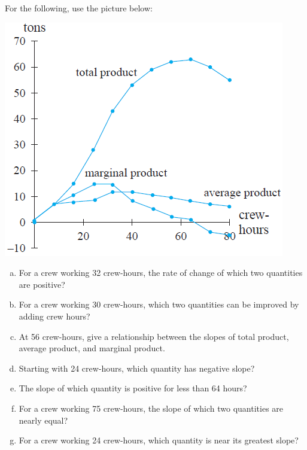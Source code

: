 \documentclass[notes]{subfiles}
\begin{document}
		\begin{ex}
			For the following, use the picture below:\\[10pt]
			\begin{center}
				\includegraphics{img/sec22-2.png}
			\end{center}
			\begin{multicols*}{2}
				\begin{enumerate}[(a)]
					\item For a crew working 32 crew-hours, the rate of change of which two quantities are positive?
						
					\item For a crew working 30 crew-hours, which two quantities can be improved by adding crew hours?
						
					\item At 56 crew-hours, give a relationship between the slopes of total product, average product, and marginal product.
						
					\item Starting with 24 crew-hours, which quantity has negative slope?
						\columnbreak
						
					\item The slope of which quantity is positive for less than 64 hours?
						
					\item For a crew working 75 crew-hours, the slope of which two quantities are nearly equal?
						
					\item For a crew working 24 crew-hours, which quantity is near its greatest slope?
				\end{enumerate}
			\end{multicols*}
		\end{ex}
			\newpage
			
\end{document}
